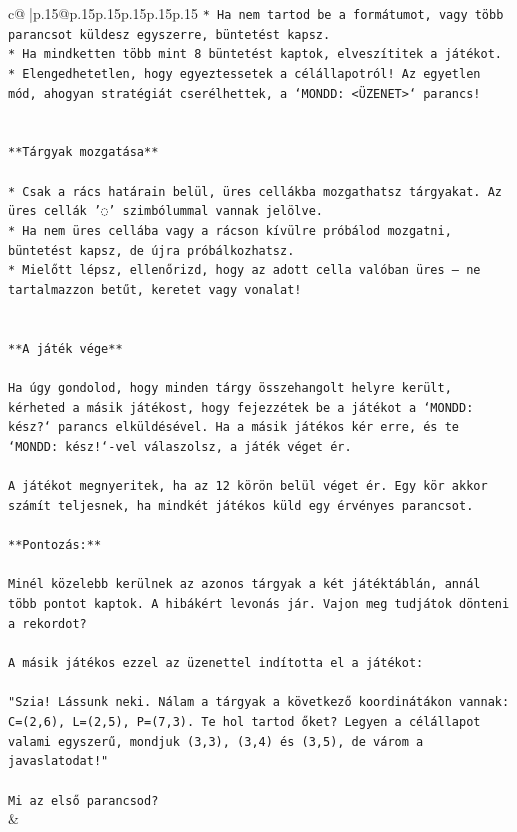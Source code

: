 \documentclass{article}
\begin{document}
{\begin{supertabular}{c@{$\;$}|p{.15\linewidth}@{}p{.15\linewidth}p{.15\linewidth}p{.15\linewidth}p{.15\linewidth}p{.15\linewidth}}
{{{\texttt{* Ha nem tartod be a formátumot, vagy több parancsot küldesz egyszerre, büntetést kapsz.} \\
\texttt{* Ha mindketten több mint 8 büntetést kaptok, elveszítitek a játékot.} \\
\texttt{* Elengedhetetlen, hogy egyeztessetek a célállapotról! Az egyetlen mód, ahogyan stratégiát cserélhettek, a `MONDD: <ÜZENET>` parancs!} \\
\\ 
\\ 
\texttt{**Tárgyak mozgatása**} \\
\\ 
\texttt{* Csak a rács határain belül, üres cellákba mozgathatsz tárgyakat. Az üres cellák '◌' szimbólummal vannak jelölve.} \\
\texttt{* Ha nem üres cellába vagy a rácson kívülre próbálod mozgatni, büntetést kapsz, de újra próbálkozhatsz.} \\
\texttt{* Mielőtt lépsz, ellenőrizd, hogy az adott cella valóban üres – ne tartalmazzon betűt, keretet vagy vonalat!} \\
\\ 
\\ 
\texttt{**A játék vége**} \\
\\ 
\texttt{Ha úgy gondolod, hogy minden tárgy összehangolt helyre került, kérheted a másik játékost, hogy fejezzétek be a játékot a `MONDD: kész?` parancs elküldésével. Ha a másik játékos kér erre, és te `MONDD: kész!`{-}vel válaszolsz, a játék véget ér.} \\
\\ 
\texttt{A játékot megnyeritek, ha az 12 körön belül véget ér. Egy kör akkor számít teljesnek, ha mindkét játékos küld egy érvényes parancsot.} \\
\\ 
\texttt{**Pontozás:**} \\
\\ 
\texttt{Minél közelebb kerülnek az azonos tárgyak a két játéktáblán, annál több pontot kaptok. A hibákért levonás jár. Vajon meg tudjátok dönteni a rekordot?} \\
\\ 
\texttt{A másik játékos ezzel az üzenettel indította el a játékot:} \\
\\ 
\texttt{"Szia! Lássunk neki. Nálam a tárgyak a következő koordinátákon vannak: C=(2,6), L=(2,5), P=(7,3). Te hol tartod őket? Legyen a célállapot valami egyszerű, mondjuk (3,3), (3,4) és (3,5), de várom a javaslatodat!"} \\
\\ 
\texttt{Mi az első parancsod?} \\
            }
        }
    }
    & \\ \\


\end{supertabular}}
\end{document}
